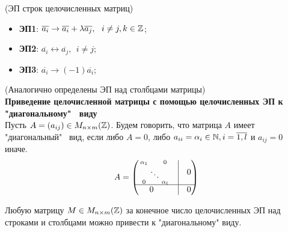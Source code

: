 \begin{definition}(ЭП строк целочисленных матриц)
    \begin{itemize}
        \item \textbf{ЭП1}: $\overline{a_i} \to \overline{a_i} + \lambda \overline{a_j}, \ \ i \neq j, k \in \mathbb{Z}$;
        \item \textbf{ЭП2}: $\overline{a_i} \leftrightarrow  \overline{a_j}, \ \ i \neq j$;
        \item \textbf{ЭП3}: $\overline{a_i} \rightarrow (-1) \overline{a_i}$;
    \end{itemize}
\end{definition}
(Аналогично определены ЭП над столбцами матрицы)\\
\textbf{Приведение целочисленной матрицы с помощью целочисленных ЭП к "диагональному" \ виду}\\
Пусть $A = (a_{ij}) \in M_{n \times m}(\mathbb{Z})$.
Будем говорить, что матрица $A$ имеет "диагональный" \ вид, если либо $A = 0$, либо $a_{ii} = \alpha_i \in \mathbb{N}, i = \overline{1,l}$ и $a_{ij} = 0$ иначе.
\[ A = \begin{pmatrix}
      \begin{smallmatrix}
    \alpha_1&&0\\ &\ddots&\\ 0&&\alpha_l
    \end{smallmatrix}  & \vline  & 0\\
     \hline
       0  \ \ & \vline& 0\\

    \end{pmatrix}\]
\begin{lemma}
    Любую матрицу $M\in M_{n \times m}(\mathbb{Z})$ за конечное число целочисленных ЭП над строками и столбцами можно привести к "диагональному" виду. 
\end{lemma}
